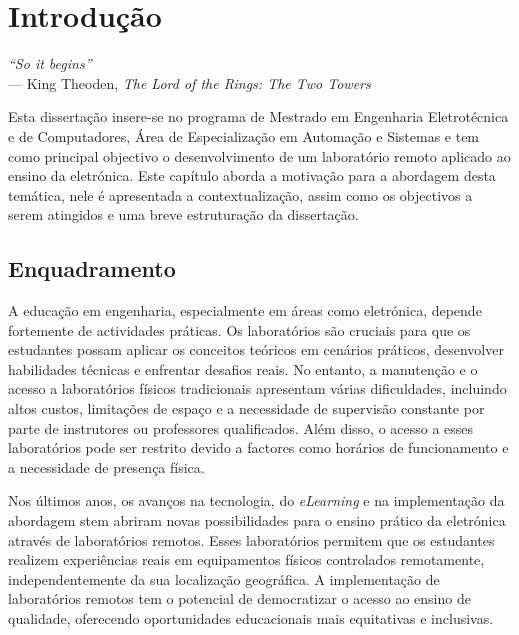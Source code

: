 
\chapter{Introdução} 	%
\label{Capítulo1} 		%

\begin{flushright}
\textit{``So it begins''} \\[0.5em]
--- King Theoden, \textit{The Lord of the Rings: The Two Towers}
\end{flushright}
Esta dissertação insere-se no programa de Mestrado em Engenharia Eletrotécnica e de Computadores, Área de Especialização em Automação e Sistemas e tem como principal objectivo o desenvolvimento de um \acrfull{laboratório remoto} aplicado ao ensino da eletrónica.
Este capítulo aborda a motivação para a abordagem desta temática, nele é apresentada a contextualização, assim como os objectivos a serem atingidos e uma breve estruturação da dissertação.

\section{Enquadramento}
\label{sec: Enquadramento}
A educação em engenharia, especialmente em áreas como eletrónica, depende fortemente de actividades práticas. Os laboratórios são cruciais para que os estudantes possam aplicar os conceitos teóricos em cenários práticos, desenvolver habilidades técnicas e enfrentar desafios reais\cite{Hofstein}\cite{BRINSON2015218}. No entanto, a manutenção e o acesso a laboratórios físicos tradicionais apresentam várias dificuldades, incluindo altos custos, limitações de espaço e a necessidade de supervisão constante por parte de instrutores ou professores qualificados\cite{feisel}. Além disso, o acesso a esses laboratórios pode ser restrito devido a factores como horários de funcionamento e a necessidade de presença física.

Nos últimos anos, os avanços na tecnologia, do \textit{eLearning} e na implementação da abordagem \acrfull{stem} abriram novas possibilidades para o ensino prático da eletrónica através de laboratórios remotos. Esses laboratórios permitem que os estudantes realizem experiências reais em equipamentos físicos controlados remotamente, independentemente da sua localização geográfica. A implementação de laboratórios remotos tem o potencial de democratizar o acesso ao ensino de qualidade, oferecendo oportunidades educacionais mais equitativas e inclusivas\cite{CORTER20112054}.

